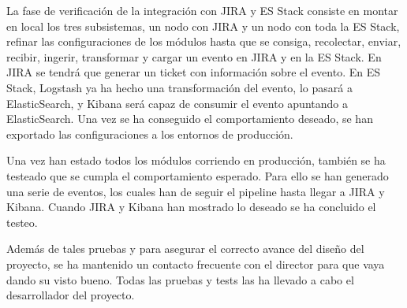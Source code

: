 La fase de verificación de la integración con JIRA y ES Stack consiste en montar en local los tres subsistemas, un nodo con JIRA y un nodo con toda la ES Stack, refinar las configuraciones de los módulos hasta que se consiga, recolectar, enviar, recibir, ingerir, transformar y cargar un evento en JIRA y en la ES Stack. En JIRA se tendrá que generar un ticket con información sobre el evento. En ES Stack, Logstash ya ha hecho una transformación del evento, lo pasará a ElasticSearch, y Kibana será capaz de consumir el evento apuntando a ElasticSearch. Una vez se ha conseguido el comportamiento deseado, se han exportado las configuraciones a los entornos de producción.

Una vez han estado todos los módulos corriendo en producción, también se ha testeado que se cumpla el comportamiento esperado. Para ello se han generado una serie de eventos, los cuales han de seguir el pipeline hasta llegar a JIRA y Kibana. Cuando JIRA y Kibana han mostrado lo deseado se ha concluido el testeo.

Además de tales pruebas y para asegurar el correcto avance del diseño del proyecto, se ha mantenido un contacto frecuente con el director para que vaya dando su visto bueno. Todas las pruebas y tests las ha llevado a cabo el desarrollador del proyecto.